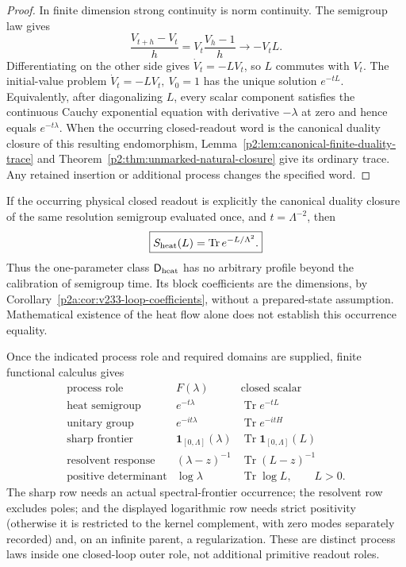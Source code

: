 \documentclass[12pt,a4paper]{article}
\begin{document}
\begin{proof}
In finite dimension strong continuity is norm continuity.  The semigroup law
gives
\[
 \frac{V_{t+h}-V_t}{h}
 =V_t\frac{V_h-1}{h}\longrightarrow -V_tL.
\]
Differentiating on the other side gives
\(\dot V_t=-LV_t\), so \(L\) commutes with \(V_t\).  The initial-value
problem
\(\dot V_t=-LV_t,\ V_0=1\) has the unique solution \(e^{-tL}\).  Equivalently,
after diagonalizing \(L\), every scalar component satisfies the continuous
Cauchy exponential equation with derivative \(-\lambda\) at zero and hence
equals \(e^{-t\lambda}\). When the occurring closed-readout word is
the canonical duality closure of this resulting endomorphism,
Lemma~\ref{p2:lem:canonical-finite-duality-trace} and
Theorem~\ref{p2:thm:unmarked-natural-closure} give its ordinary trace.
Any retained insertion or additional process changes the specified word.
\end{proof}

\begin{corollary}
\label{p2d:cor:atomic-heat-readout}
If the occurring physical closed readout is explicitly the canonical
duality closure of the same resolution semigroup evaluated once, and \(t=\Lambda^{-2}\), then
\[
 \boxed{S_{\rm heat}(L)=\operatorname{Tr}e^{-L/\Lambda^2}.}
\]
Thus the one-parameter class \(\mathsf D_{\mathrm{heat}}\) has no arbitrary profile beyond the
calibration of semigroup time. Its block coefficients are the dimensions,
by Corollary~\ref{p2a:cor:v233-loop-coefficients}, without a prepared-state
assumption. Mathematical existence of the heat flow alone
does not establish this occurrence equality.
\end{corollary}

\begin{remark}
Once the indicated process role and required domains are supplied, finite
functional calculus gives
\[
\begin{array}{c|c|c}
 \text{process role}&F(\lambda)&\text{closed scalar}\\ \hline
 \text{heat semigroup}&e^{-t\lambda}&\operatorname{Tr}e^{-tL}\\
 \text{unitary group}&e^{-it\lambda}&\operatorname{Tr}e^{-itH}\\
 \text{sharp frontier}&\mathbf1_{[0,\Lambda]}(\lambda)&
   \operatorname{Tr}\mathbf1_{[0,\Lambda]}(L)\\
 \text{resolvent response}&(\lambda-z)^{-1}&
   \operatorname{Tr}(L-z)^{-1}\\
 \text{positive determinant}&\log\lambda&
   \operatorname{Tr}\log L,\qquad L>0.
\end{array}
\]
The sharp row needs an actual spectral-frontier occurrence; the resolvent row
excludes poles; and the displayed logarithmic row needs strict positivity
(otherwise it is restricted to the kernel complement, with zero modes
separately recorded) and, on an infinite parent, a regularization.  These are distinct process laws
inside one closed-loop outer role, not additional primitive readout roles.
\end{remark}
\end{document}
